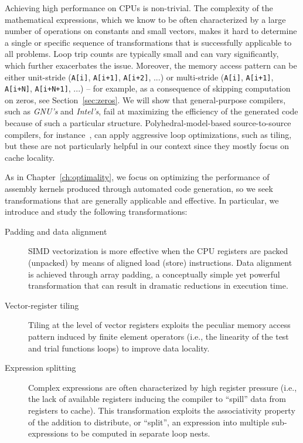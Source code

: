 Achieving high performance on CPUs is non-trivial. The complexity of the mathematical expressions, which we know to be often characterized by a large number of operations on constants and small vectors, makes it hard to determine a single or specific sequence of transformations that is successfully applicable to all problems. Loop trip counts are typically small and can vary significantly, which further exacerbates the issue. Moreover, the memory access pattern can be either unit-stride (\texttt{A[i]}, \texttt{A[i+1]}, \texttt{A[i+2]}, ...) or multi-stride (\texttt{A[i]}, \texttt{A[i+1]}, \texttt{A[i+N]}, \texttt{A[i+N+1]}, ...) -- for example, as a consequence of skipping computation on zeros, see Section~\ref{sec:zeros}. We will show that general-purpose compilers, such as \emph{GNU's} and \emph{Intel's}, fail at maximizing the efficiency of the generated code because of such a particular structure. Polyhedral-model-based source-to-source compilers, for instance~\cite{pluto}, can apply aggressive loop optimizations, such as tiling, but these are not particularly helpful in our context since they mostly focus on cache locality. 

As in Chapter~\ref{ch:optimality}, we focus on optimizing the performance of assembly kernels produced through automated code generation, so we seek transformations that are generally applicable and effective. In particular, we introduce and study the following transformations:

\begin{description}
\item[Padding and data alignment] SIMD vectorization is more effective when the CPU registers are packed (unpacked) by means of aligned load (store) instructions. Data alignment is achieved through array padding, a conceptually simple yet powerful transformation that can result in dramatic reductions in execution time. 
\item[Vector-register tiling] Tiling at the level of vector registers exploits the peculiar memory access pattern induced by finite element operators (i.e., the linearity of the test and trial functions loops) to improve data locality.
\item[Expression splitting] Complex expressions are often characterized by high register pressure (i.e., the lack of available registers inducing the compiler to ``spill'' data from registers to cache). This transformation exploits the associativity property of the addition to distribute, or ``split'', an expression into multiple sub-expressions to be computed in separate loop nests.
\end{description}

